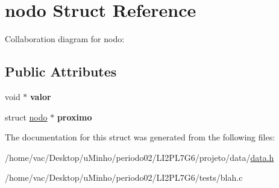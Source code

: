 \hypertarget{structnodo}{}\section{nodo Struct Reference}
\label{structnodo}


Collaboration diagram for nodo\+:
\subsection*{Public Attributes}
\begin{DoxyCompactItemize}
\item 
\mbox{\label{structnodo_a344b5b1cb9597ce38786e9d21bb6f42d}} 
void $\ast$ {\bfseries valor}
\item 
\mbox{\label{structnodo_a89841e92650be541e8bc568a20765e82}} 
struct \hyperlink{structnodo}{nodo} $\ast$ {\bfseries proximo}
\end{DoxyCompactItemize}


The documentation for this struct was generated from the following files\+:\begin{DoxyCompactItemize}
\item 
/home/vac/\+Desktop/u\+Minho/periodo02/\+L\+I2\+P\+L7\+G6/projeto/data/\hyperlink{data_8h}{data.\+h}\item 
/home/vac/\+Desktop/u\+Minho/periodo02/\+L\+I2\+P\+L7\+G6/tests/blah.\+c\end{DoxyCompactItemize}
